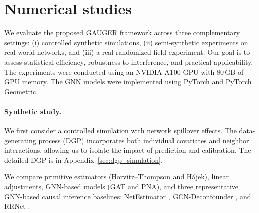 \documentclass[twoside,letterpaper]{article}
\theoremstyle{plain}
\theoremstyle{definition}
\theoremstyle{remark}
\begin{document}
\section{Numerical studies}\label{sec:simulation}

We evaluate the proposed GAUGER framework across three complementary settings: (i) controlled synthetic simulations, (ii) semi-synthetic experiments on real-world networks, and (iii) a real randomized field experiment. Our goal is to assess statistical efficiency, robustness to interference, and practical applicability. The experiments were conducted using an NVIDIA A100 GPU with
80\,GB of GPU memory. The GNN models were implemented using
PyTorch and PyTorch Geometric.

\paragraph{Synthetic study.}
We first consider a controlled simulation with network spillover effects. The data-generating process (DGP) incorporates both individual covariates and neighbor interactions, allowing us to isolate the impact of prediction and calibration. The detailed DGP is in Appendix~\ref{sec:dgp_simulation}.

We compare primitive estimators (Horvitz--Thompson and H\'{a}jek), linear adjustments, GNN-based models (GAT and PNA), and three representative GNN-based causal inference baselines: NetEstimator \citep{jiang2022estimating}, GCN-Deconfounder \citep{guo2020learning}, and RRNet \citep{cai2023generalization}.
\end{document}
